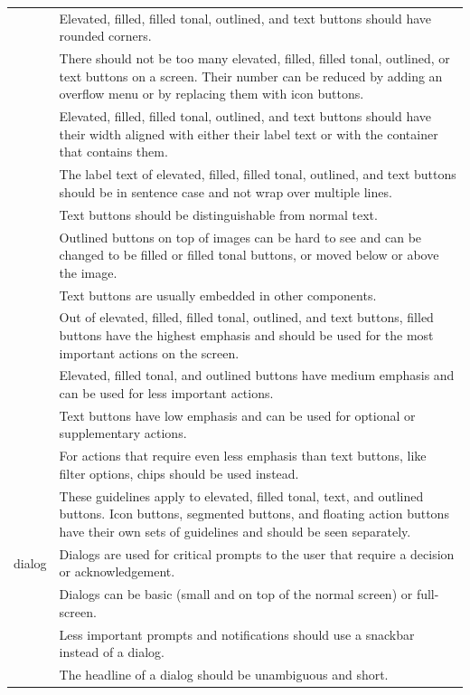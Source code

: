 \documentclass[11pt,titlepage,oneside,openany]{book}
\begin{document}
\begin{longtable}{|p{}|p{}|}
	~ & Elevated, filled, filled tonal, outlined, and text buttons should have rounded corners. \\ 
	~ & There should not be too many elevated, filled, filled tonal, outlined, or text buttons on a screen. Their number can be reduced by adding an overflow menu or by replacing them with icon buttons. \\ 
	~ & Elevated, filled, filled tonal, outlined, and text buttons should have their width aligned with either their label text or with the container that contains them. \\ 
	~ & The label text of elevated, filled, filled tonal, outlined, and text buttons should be in sentence case and not wrap over multiple lines. \\ 
	~ & Text buttons should be distinguishable from normal text. \\ 
	~ & Outlined buttons on top of images can be hard to see and can be changed to be filled or filled tonal buttons, or moved below or above the image. \\ 
	~ & Text buttons are usually embedded in other components. \\ 
	~ & Out of elevated, filled, filled tonal, outlined, and text buttons, filled buttons have the highest emphasis and should be used for the most important actions on the screen. \\ 
	~ & Elevated, filled tonal, and outlined buttons have medium emphasis and can be used for less important actions. \\ 
	~ & Text buttons have low emphasis and can be used for optional or supplementary actions. \\ 
	~ & For actions that require even less emphasis than text buttons, like filter options, chips should be used instead. \\ 
	~ & These guidelines apply to elevated, filled tonal, text, and outlined buttons. Icon buttons, segmented buttons, and floating action buttons have their own sets of guidelines and should be seen separately. \\ \hline
	dialog & Dialogs are used for critical prompts to the user that require a decision or acknowledgement. \\ 
	~ & Dialogs can be basic (small and on top of the normal screen) or full-screen. \\ 
	~ & Less important prompts and notifications should use a snackbar instead of a dialog. \\ 
	~ & The headline of a dialog should be unambiguous and short. \\ 

\end{longtable}
\end{document}
